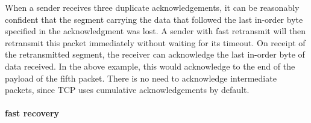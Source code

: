 {\begin{extrainfo}
When a sender receives three duplicate acknowledgements, it can be reasonably confident that the segment carrying the data that followed the last in-order byte specified in the acknowledgment was lost. 
A sender with fast retransmit will then retransmit this packet immediately without waiting for its timeout.
On receipt of the retransmitted segment, the receiver can acknowledge the last in-order byte of data received.
In the above example, this would acknowledge to the end of the payload of the fifth packet.
There is no need to acknowledge intermediate packets, since \acs{TCP} uses cumulative acknowledgements by default.

\paragraph{fast recovery}\leavevmode
\end{extrainfo}
}


